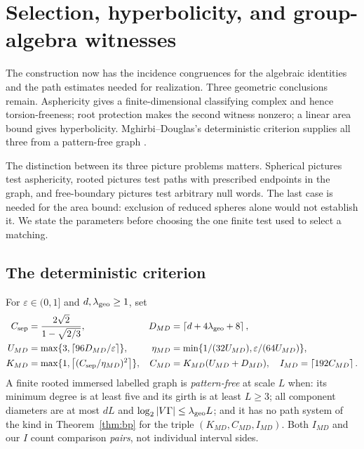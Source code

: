 \section{Selection, hyperbolicity, and group-algebra witnesses}\label{sec:realization}
The construction now has the incidence congruences for the algebraic identities and the path estimates needed for realization. Three geometric conclusions remain. Asphericity gives a finite-dimensional classifying complex and hence torsion-freeness; root protection makes the second witness nonzero; a linear area bound gives hyperbolicity. Mghirbi--Douglas's deterministic criterion supplies all three from a pattern-free graph \cite[Theorem~B]{MD26}.

The distinction between its three picture problems matters. Spherical pictures test asphericity, rooted pictures test paths with prescribed endpoints in the graph, and free-boundary pictures test arbitrary null words. The last case is needed for the area bound: exclusion of reduced spheres alone would not establish it. We state the parameters before choosing the one finite test used to select a matching.

\subsection{The deterministic criterion}
For $\varepsilon\in(0,1]$ and $d,\lambda_{\rm geo}\ge1$, set
\begin{align}
 C_{\rm sep}&=\frac{2\sqrt2}{1-\sqrt{2/3}},&
 D_{MD}&=\left\lceil d+4\lambda_{\rm geo}+8\right\rceil,\nonumber\\
 U_{MD}&=\max\{3,\left\lceil 96D_{MD}/\varepsilon\right\rceil\},&
 \eta_{MD}&=\min\{1/(32U_{MD}),\varepsilon/(64U_{MD})\},\label{eq:md-constants}\\
 K_{MD}&=\max\{1,\left\lceil (C_{\rm sep}/\eta_{MD})^2\right\rceil\},&
 C_{MD}&=K_{MD}(U_{MD}+D_{MD}),\quad I_{MD}=\left\lceil 192C_{MD}\right\rceil.\nonumber
\end{align}
A finite rooted immersed labelled graph is \emph{pattern-free} at scale $L$ when: its minimum degree is at least five and its girth is at least $L\ge3$; all component diameters are at most $dL$ and $\log_2|V\Gamma|\le\lambda_{\rm geo}L$; and it has no path system of the kind in Theorem~\ref{thm:bp} for the triple $(K_{MD},C_{MD},I_{MD})$. Both $I_{MD}$ and our $I$ count comparison \emph{pairs}, not individual interval sides.

